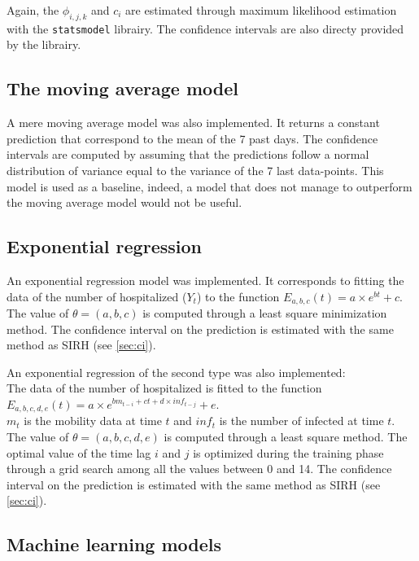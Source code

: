 Again, the $\phi_{i,j,k}$ and  $c_i$ are estimated through maximum likelihood estimation with the \texttt{statsmodel} librairy. 
The confidence intervals are also directy provided by the librairy.



\subsection{The moving average model}
\label{sec:moving_average}

A mere moving average model was also implemented. 
It returns a constant prediction that correspond to the mean of the 7 past days. 
The confidence intervals are computed by assuming that the predictions follow a normal distribution of variance equal to the variance of the 7 last data-points.
This model is used as a baseline, indeed, a model that does not manage to outperform the moving average model would not be useful. 

\subsection{Exponential regression}

An exponential regression model was implemented.
It corresponds to fitting the data of the number of hospitalized ($Y_t$) to the function $E_{a, b, c}(t) = a \times e^{b t} +c$.
The value of $\theta = (a, b, c)$ is computed through a least square minimization method.
The confidence interval on the prediction is estimated with the same method as SIRH (see \ref{sec:ci}). 

An exponential regression of the second type was also implemented: \\
The data of the number of hospitalized is fitted to the function $E_{a, b, c, d, e}(t) = a \times e^{b m_{t-i} + c  t + d \times inf_{t-j} }+e$.\\
$m_t$ is the mobility data at time $t$ and $inf_t$ is the number of infected at time $t$.
The value of $\theta = (a, b, c, d, e)$ is computed through a least square method.
The optimal value of the time lag $i$ and $j$ is optimized during the training phase through a grid search among all the values between 0 and 14. 
The confidence interval on the prediction is estimated with the same method as SIRH (see \ref{sec:ci}). 

\subsection{Machine learning models}
\label{sec:mlmodels}

